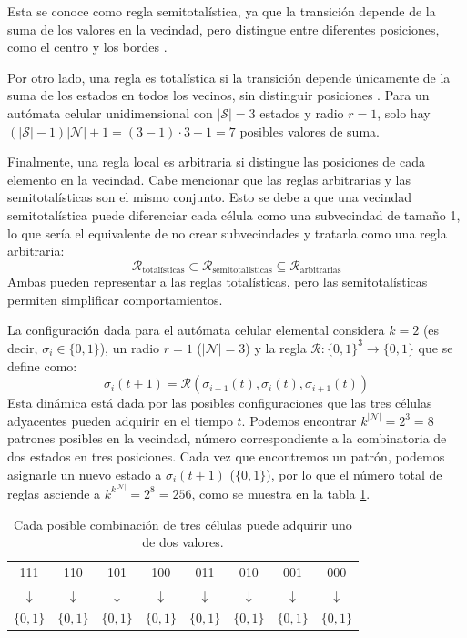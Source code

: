 Esta se conoce como regla semitotalística, ya que la transición depende de la suma de los valores en la vecindad, pero distingue entre diferentes posiciones, como el centro y los bordes \cite{genaro2022_semitotalistic}.

Por otro lado, una regla es totalística si la transición depende únicamente de la suma de los estados en todos los vecinos, sin distinguir posiciones \cite{weisstein2002_totalistic}. Para un autómata celular unidimensional con $|\mathcal{S}| = 3$ estados y radio $r = 1$, solo hay $(|\mathcal{S}|-1) |\mathcal{N}|+1 = (3-1) \cdot 3 + 1 = 7$ posibles valores de suma.

Finalmente, una regla local es arbitraria si distingue las posiciones de cada elemento en la vecindad. Cabe mencionar que las reglas arbitrarias y las semitotalísticas son el mismo conjunto. Esto se debe a que una vecindad semitotalística puede diferenciar cada célula como una subvecindad de tamaño 1, lo que sería el equivalente de no crear subvecindades y tratarla como una regla arbitraria:
\[
	\mathcal{R}_{\text{totalísticas}} \subset \mathcal{R}_{\text{semitotalísticas}} \subseteq \mathcal{R}_{\text{arbitrarias}}
\]
Ambas pueden representar a las reglas totalísticas, pero las semitotalísticas permiten simplificar comportamientos.

La configuración dada para el autómata celular elemental considera $k = 2$ (es decir, $\sigma_i \in \{0, 1\}$), un radio $r = 1$ ($|\mathcal{N}| = 3$) y la regla $\mathcal{R}: \{0,1\}^3 \rightarrow \{0,1\}$ que se define como:
\[
\sigma_i(t + 1) = \mathcal{R}(\sigma_{i-1}(t), \sigma_{i}(t), \sigma_{i+1}(t))
\]
Esta dinámica está dada por las posibles configuraciones que las tres células adyacentes pueden adquirir en el tiempo $t$. Podemos encontrar $k^{|\mathcal{N}|} = 2^3 = 8$ patrones posibles en la vecindad, número correspondiente a la combinatoria de dos estados en tres posiciones. Cada vez que encontremos un patrón, podemos asignarle un nuevo estado a $\sigma_i(t + 1)$ ($\{ 0, 1 \}$), por lo que el número total de reglas asciende a $k^{k^{|\mathcal{N}|}} = 2^8 = 256$, como se muestra en la tabla \ref{tab:ECA_evolucion}.

\begin{table}[!htbp]
	\centering
	\begin{tabular}{c c c c c c c c} 
		111 & 110 & 101 & 100 & 011 & 010 & 001 & 000 \\
		$\downarrow$ & $\downarrow$ & $\downarrow$ & $\downarrow$ & $\downarrow$ & $\downarrow$ & $\downarrow$ & $\downarrow$ \\
		$\{ 0, 1 \}$ & $\{ 0, 1 \}$ & $\{ 0, 1 \}$ & $\{ 0, 1 \}$ & $\{ 0, 1 \}$ & $\{ 0, 1 \}$ & $\{ 0, 1 \}$ & $\{ 0, 1 \}$ 
	\end{tabular}
	
	\caption{Cada posible combinación de tres células puede adquirir uno de dos valores. }
	
	\label{tab:ECA_evolucion}
	
\end{table}

